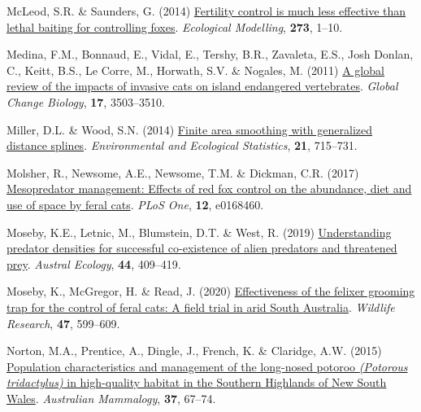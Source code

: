 \documentclass[preprint, 3p, authoryear]{elsarticle} %
\newlength{\cslhangindent}
\newlength{\cslentryspacingunit} %
\newenvironment{CSLReferences}[2] %
 {%
  \setlength{\parindent}{0pt}
  \ifodd #1
  \let\oldpar\par
  \def\par{\hangindent=\cslhangindent\oldpar}
  \fi
  \setlength{\parskip}{#2\cslentryspacingunit}
 }%
 {}
\begin{document}
\begin{CSLReferences}{1}{0}
\leavevmode{}%
McLeod, S.R. \& Saunders, G. (2014) \href{https://doi.org/10.1016/j.ecolmodel.2013.10.016}{Fertility control is much less effective than lethal baiting for controlling foxes}. \emph{Ecological Modelling}, \textbf{273}, 1--10.

\leavevmode{}%
Medina, F.M., Bonnaud, E., Vidal, E., Tershy, B.R., Zavaleta, E.S., Josh Donlan, C., Keitt, B.S., Le Corre, M., Horwath, S.V. \& Nogales, M. (2011) \href{https://doi.org/10.1111/j.1365-2486.2011.02464.x}{A global review of the impacts of invasive cats on island endangered vertebrates}. \emph{Global Change Biology}, \textbf{17}, 3503--3510.

\leavevmode{}%
Miller, D.L. \& Wood, S.N. (2014) \href{https://doi.org/10.1007/s10651-014-0277-4}{Finite area smoothing with generalized distance splines}. \emph{Environmental and Ecological Statistics}, \textbf{21}, 715--731.

\leavevmode{}%
Molsher, R., Newsome, A.E., Newsome, T.M. \& Dickman, C.R. (2017) \href{https://doi.org/10.1371/journal.pone.0168460}{Mesopredator management: Effects of red fox control on the abundance, diet and use of space by feral cats}. \emph{PLoS One}, \textbf{12}, e0168460.

\leavevmode{}%
Moseby, K.E., Letnic, M., Blumstein, D.T. \& West, R. (2019) \href{https://doi.org/10.1111/aec.12697}{Understanding predator densities for successful co-existence of alien predators and threatened prey}. \emph{Austral Ecology}, \textbf{44}, 409--419.

\leavevmode{}%
Moseby, K., McGregor, H. \& Read, J. (2020) \href{https://doi.org/10.1071/WR19132}{Effectiveness of the felixer grooming trap for the control of feral cats: A field trial in arid {South {A}ustralia}}. \emph{Wildlife Research}, \textbf{47}, 599--609.

\leavevmode{}%
Norton, M.A., Prentice, A., Dingle, J., French, K. \& Claridge, A.W. (2015) \href{https://doi.org/10.1071/AM14026}{Population characteristics and management of the long-nosed potoroo \emph{({Potorous tridactylus})} in high-quality habitat in the {Southern Highlands of New South Wales}}. \emph{Australian Mammalogy}, \textbf{37}, 67--74.


\end{CSLReferences}
\end{document}
